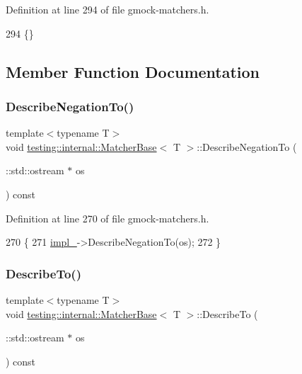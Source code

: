 Definition at line 294 of file gmock-\/matchers.\+h.


\begin{DoxyCode}
294 \{\}
\end{DoxyCode}


\subsection{Member Function Documentation}
\mbox{\label{classtesting_1_1internal_1_1MatcherBase_ac1089d49b6b8a381900618985cd69b7f}} 
\subsubsection{\texorpdfstring{Describe\+Negation\+To()}{DescribeNegationTo()}}
{\footnotesize\ttfamily template$<$typename T$>$ \\
void \hyperlink{classtesting_1_1internal_1_1MatcherBase}{testing\+::internal\+::\+Matcher\+Base}$<$ T $>$\+::Describe\+Negation\+To (\begin{DoxyParamCaption}\item[{\+::std\+::ostream $\ast$}]{os }\end{DoxyParamCaption}) const\hspace{0.3cm}{\ttfamily [inline]}}



Definition at line 270 of file gmock-\/matchers.\+h.


\begin{DoxyCode}
270                                                 \{
271     \hyperlink{classtesting_1_1internal_1_1MatcherBase_ab4bf73686e35b5f033e7db82498644aa}{impl\_}->DescribeNegationTo(os);
272   \}
\end{DoxyCode}
\mbox{\label{classtesting_1_1internal_1_1MatcherBase_a7e0c883c7745e0d646463077ef1c1267}} 
\subsubsection{\texorpdfstring{Describe\+To()}{DescribeTo()}}
{\footnotesize\ttfamily template$<$typename T$>$ \\
void \hyperlink{classtesting_1_1internal_1_1MatcherBase}{testing\+::internal\+::\+Matcher\+Base}$<$ T $>$\+::Describe\+To (\begin{DoxyParamCaption}\item[{\+::std\+::ostream $\ast$}]{os }\end{DoxyParamCaption}) const\hspace{0.3cm}{\ttfamily [inline]}}



